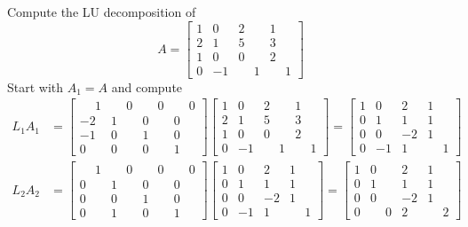 \begin{example}
Compute the LU decomposition of
$$
A = \left[ \begin{array}{rrrr} 1 & 0 & 2 & 1 \\ 2 & 1 & 5 & 3 \\ 1 & 0 & 0 & 2 \\ 0 & -1 & \phantom{+}1 & \phantom{+}1 \end{array} \right]
$$
Start with $A_1 = A$ and compute
\begin{align*}
L_1 A_1 &=
\left[ \begin{array}{rrrr} \phantom{+}1 & \phantom{+}0 & \phantom{+}0 & \phantom{+}0 \\ -2 & 1 & 0 & 0 \\ -1 & 0 & 1 & 0 \\ 0 & 0 & 0 & 1 \end{array} \right]
\left[ \begin{array}{rrrr} 1 & 0 & 2 & 1 \\ 2 & 1 & 5 & 3 \\ 1 & 0 & 0 & 2 \\ 0 & -1 & \phantom{+}1 & \phantom{+}1 \end{array} \right]
=
\left[ \begin{array}{rrrr} 1 & 0 & 2 & 1 \\ 0 & 1 & 1 & 1 \\ 0 & 0 & -2 & 1 \\ 0 & -1 & 1 & \phantom{+}1 \end{array} \right] \\
L_2 A_2 &=
\left[ \begin{array}{rrrr} \phantom{+}1 & \phantom{+}0 & \phantom{+}0 & \phantom{+}0 \\ 0 & 1 & 0 & 0 \\ 0 & 0 & 1 & 0 \\ 0 & 1 & 0 & 1 \end{array} \right]
\left[ \begin{array}{rrrr} 1 & 0 & 2 & 1 \\ 0 & 1 & 1 & 1 \\ 0 & 0 & -2 & 1 \\ 0 & -1 & 1 & \phantom{+}1 \end{array} \right]
=
\left[ \begin{array}{rrrr} 1 & 0 & 2 & 1 \\ 0 & 1 & 1 & 1 \\ 0 & 0 & -2 & 1 \\ 0 & \phantom{+}0 & 2 & \phantom{+}2 \end{array} \right] \\

\end{align*}
\end{example}
